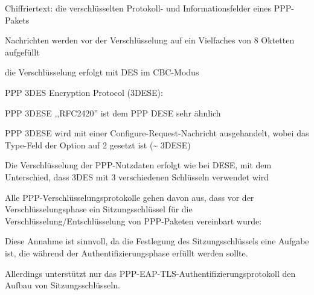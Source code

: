 \documentclass[a4paper]{article}
\begin{document}
\begin{multicols}{3}
\begin{itemize*}
\begin{itemize*}
                  \item Chiffriertext: die verschlüsselten Protokoll- und Informationsfelder eines PPP-Pakets
                  \begin{itemize*}
                        \item Nachrichten werden vor der Verschlüsselung auf ein Vielfaches von 8 Oktetten aufgefüllt
                        \item die Verschlüsselung erfolgt mit DES im CBC-Modus
                  \end{itemize*}
            \end{itemize*}
            \item PPP 3DES Encryption Protocol (3DESE):
            \begin{itemize*}
                  \item PPP 3DESE ,,RFC2420'' ist dem PPP DESE sehr ähnlich
                  \item PPP 3DESE wird mit einer Configure-Request-Nachricht ausgehandelt, wobei das Type-Feld der Option auf 2 gesetzt ist (\textasciitilde{} 3DESE)
                  \item Die Verschlüsselung der PPP-Nutzdaten erfolgt wie bei DESE, mit dem Unterschied, dass 3DES mit 3 verschiedenen Schlüsseln verwendet wird
            \end{itemize*}
            \item Alle PPP-Verschlüsselungsprotokolle gehen davon aus, dass vor der
            Verschlüsselungsphase ein Sitzungsschlüssel für die
            Verschlüsselung/Entschlüsselung von PPP-Paketen vereinbart wurde:
            \begin{itemize*}
                  \item Diese Annahme ist sinnvoll, da die Festlegung des Sitzungsschlüssels eine Aufgabe ist, die während der Authentifizierungsphase erfüllt werden sollte.
                  \item Allerdings unterstützt nur das PPP-EAP-TLS-Authentifizierungsprotokoll den Aufbau von Sitzungsschlüsseln.
            \end{itemize*}
      \end{itemize*}


\end{multicols}
\end{document}
